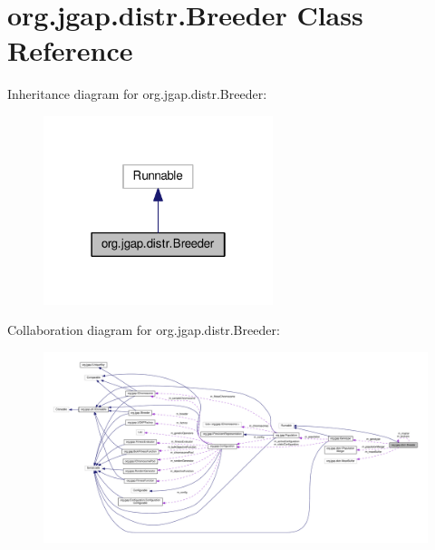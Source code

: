 \hypertarget{classorg_1_1jgap_1_1distr_1_1_breeder}{\section{org.\-jgap.\-distr.\-Breeder Class Reference}
\label{classorg_1_1jgap_1_1distr_1_1_breeder}
}


Inheritance diagram for org.\-jgap.\-distr.\-Breeder\-:
\nopagebreak
\begin{figure}[H]
\begin{center}
\leavevmode
\includegraphics[width=190pt]{classorg_1_1jgap_1_1distr_1_1_breeder__inherit__graph}
\end{center}
\end{figure}


Collaboration diagram for org.\-jgap.\-distr.\-Breeder\-:
\nopagebreak
\begin{figure}[H]
\begin{center}
\leavevmode
\includegraphics[width=350pt]{classorg_1_1jgap_1_1distr_1_1_breeder__coll__graph}
\end{center}
\end{figure}

